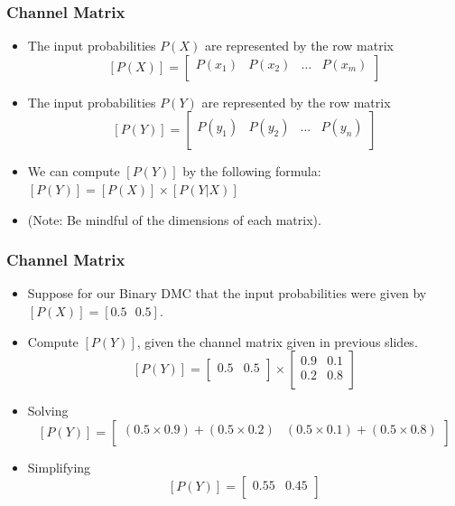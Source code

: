\documentclass[a4]{beamer}
\begin{document}
\begin{frame}
\frametitle{Channel Matrix}
\begin{itemize}
\item The input probabilities $P(X)$ are represented by the row matrix
\[  [P(X)]  = \left[ \begin{array}{cccc}
P(x_1) & P(x_2) & \ldots & P(x_m) \\
\end{array} \right] \]
\item The input probabilities $P(Y)$ are represented by the row matrix
\[  [P(Y)]  = \left[ \begin{array}{cccc}
P(y_1) & P(y_2) & \ldots & P(y_n) \\
\end{array} \right] \]
\item We can compute $[P(Y)] $ by the following formula: $[P(Y)]  = [P(X)]\times [P(Y|X)]$
\item (Note: Be mindful of the dimensions of each matrix).
\end{itemize}
\end{frame}

\begin{frame}
\frametitle{Channel Matrix}
\begin{itemize}
\item Suppose for our Binary DMC that the input probabilities were given by $[P(X)] = [ 0.5\mbox{   }0.5]$.
\item Compute $[P(Y)]$, given the channel matrix given in previous slides.
\[  [P(Y)]  =  \left[ \begin{array}{cc}
0.5 & 0.5 \\
\end{array} \right] \times \left[ \begin{array}{cc}
0.9 & 0.1  \\
0.2 & 0.8 \\
\end{array} \right] \]

\item Solving
\[  [P(Y)]  =  \left[ \begin{array}{cc}
(0.5 \times 0.9)+(0.5 \times 0.2) & (0.5 \times 0.1)+(0.5 \times 0.8) \\
\end{array} \right]  \]

\item Simplifying \[  [P(Y)]  =  \left[ \begin{array}{cc}
0.55 & 0.45 \\
\end{array} \right]  \]
\end{itemize}
\end{frame}
\end{document}
